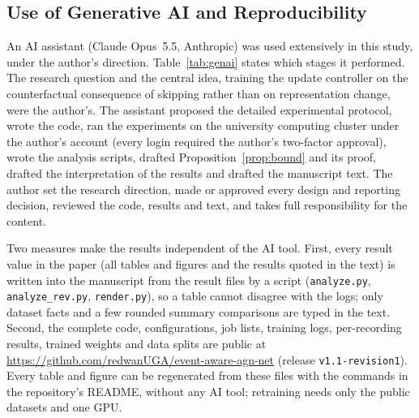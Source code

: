 \subsection{Use of Generative AI and Reproducibility}
\label{sec:genai}
An AI assistant (Claude Opus~5.5, Anthropic) was used extensively in this study, under the author's direction. Table~\ref{tab:genai} states which stages it performed. The research question and the central idea, training the update controller on the counterfactual consequence of skipping rather than on representation change, were the author's. The assistant proposed the detailed experimental protocol, wrote the code, ran the experiments on the university computing cluster under the author's account (every login required the author's two-factor approval), wrote the analysis scripts, drafted Proposition~\ref{prop:bound} and its proof, drafted the interpretation of the results and drafted the manuscript text. The author set the research direction, made or approved every design and reporting decision, reviewed the code, results and text, and takes full responsibility for the content.

Two measures make the results independent of the AI tool. First, every result value in the paper (all tables and figures and the results quoted in the text) is written into the manuscript from the result files by a script (\texttt{analyze.py}, \texttt{analyze\_rev.py}, \texttt{render.py}), so a table cannot disagree with the logs; only dataset facts and a few rounded summary comparisons are typed in the text. Second, the complete code, configurations, job lists, training logs, per-recording results, trained weights and data splits are public at \url{https://github.com/redwanUGA/event-aware-agn-net} (release \texttt{v1.1-revision1}). Every table and figure can be regenerated from these files with the commands in the repository's README, without any AI tool; retraining needs only the public datasets and one GPU.

